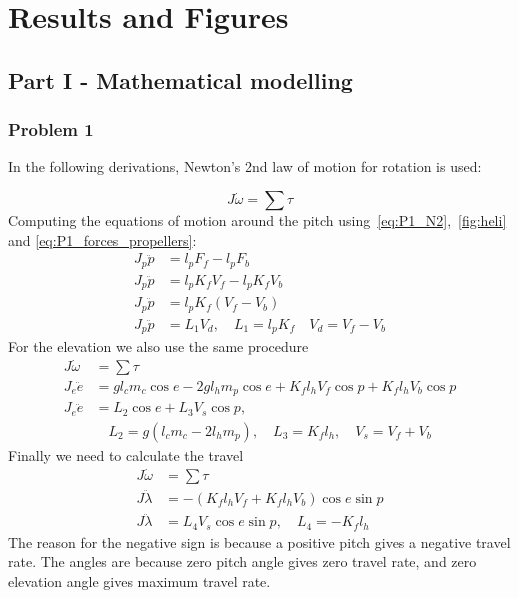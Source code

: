 \section{Results and Figures}\label{sec:figures}
\subsection{Part I - Mathematical modelling}\label{subsec:part1}
\subsubsection{Problem 1}

In the following derivations, Newton's 2nd law of motion for rotation is used:

\begin{equation}\label{eq:P1_N2}
    J \dot{\omega} = \sum \tau
\end{equation}
Computing the equations of motion around the pitch using~\cref{eq:P1_N2},~\cref{fig:heli} and \cref{eq:P1_forces_propellers}:
\begin{align}
    J_p \ddot{p} &= l_p F_f - l_p F_b \nonumber \\
    J_p \ddot{p} &= l_p K_f V_f - l_p K_f V_b \nonumber \\
    J_p \ddot{p} &= l_p K_f (V_f - V_b) \nonumber \\
    J_p \ddot{p} &= L_1 V_d, \quad L_1 = l_p K_f \quad V_d = V_f - V_b
    \label{eq:P1_pitch_non-linear}
\end{align}
For the elevation we also use the same procedure
\begin{align}
    J \dot{\omega} &= \sum \tau \nonumber \\
    J_e \ddot{e} &= g l_c m_c \cos{e} - 2 g l_h m_p \cos{e} + K_f l_h V_f \cos{p} + K_f l_h V_b \cos{p} \nonumber \\
    J_e \ddot{e} &= L_2 \cos{e} + L_3 V_s \cos{p}, \label{eq:P1_elevation_non-linear}\\    
                 &  \quad L_2 = g (l_c m_c - 2 l_h m_p),
                    \quad L_3 = K_f l_h,
                    \quad V_s = V_f + V_b \nonumber
\end{align}
Finally we need to calculate the travel
\begin{align}
    J \dot{\omega} &= \sum \tau \nonumber \\
    J\ddot{\lambda} &= -(K_f l_h V_f + K_f l_h V_b)\cos{e}\sin{p} \nonumber \\
    J\ddot{\lambda} &= L_4 V_s \cos{e} \sin{p},
                        \quad L_4 = - K_f l_h
                        \label{eq:P1_travel_non-linear}
\end{align}
The reason for the negative sign is because a positive pitch gives a negative travel rate. The angles are because zero pitch angle gives zero travel rate, and zero elevation angle gives maximum travel rate.

